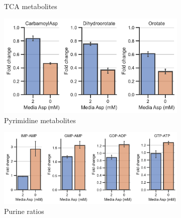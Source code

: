\begin{figure}[!ht]
\begin{subfigure}[b]{0.6\textwidth}
        \caption{TCA metabolites}
        \label{fig:sapp:143B_GOT_tca}
    \end{subfigure}
    \hfill
    \begin{subfigure}[b]{0.45\textwidth}
        \includegraphics[width=\textwidth]{figures/sapp/GOT_DKO_Asp_depl/143B_GOT_pyr.pdf}
        \caption{Pyrimidine metabolites}
        \label{fig:sapp:143B_GOT_pyr}
    \end{subfigure}
    \hfill
    \begin{subfigure}[b]{0.6\textwidth}
        \includegraphics[width=\textwidth]{figures/sapp/GOT_DKO_Asp_depl/143B_GOT_pur.pdf}
        \caption{Purine ratios}
        \label{fig:sapp:143B_GOT_pur}
    \end{subfigure}
    \hfill
    \caption{}
\end{figure}

